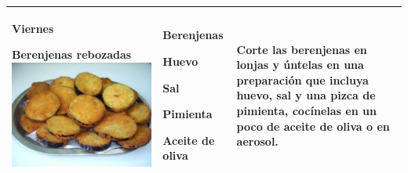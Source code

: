 \documentclass[menu.tex]{subfiles}
\begin{document}
\begin{tabular} {p{3.5cm} p{4cm} p{9cm}}
        \pbox{20cm}
        {
            \rule{0pt}{3ex}\begin{large}\textbf{Viernes}\end{large}\\
            \rule{0pt}{2ex}Berenjenas rebozadas\\
            \includegraphics[scale=0.13]{berenjenas_rebozadas}
        } & 
        \vspace{-1.8cm}
        \begin{compactitem} 
            \begin{footnotesize}
                \item Berenjenas
                \item Huevo
                \item Sal
                \item Pimienta
                \item Aceite de oliva
            \end{footnotesize}
        \end{compactitem}&
        \vspace{-1.8cm}
        Corte las berenjenas en lonjas y úntelas en una preparación que incluya huevo, sal y una pizca de pimienta, cocínelas en un poco de aceite de oliva o en aerosol.\\
        \hline
        

\end{tabular}
\end{document}
